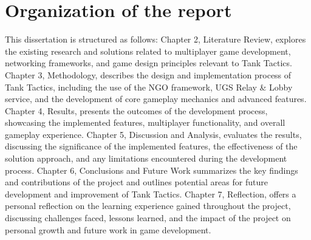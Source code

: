 \section{Organization of the report} %
\label{sec:intro_org} %
This dissertation is structured as follows: Chapter 2, Literature Review, explores the existing research and solutions related to multiplayer game development, networking frameworks, and game design principles relevant to Tank Tactics. Chapter 3, Methodology, describes the design and implementation process of Tank Tactics, including the use of the NGO framework, UGS Relay \& Lobby service, and the development of core gameplay mechanics and advanced features. Chapter 4, Results, presents the outcomes of the development process, showcasing the implemented features, multiplayer functionality, and overall gameplay experience. Chapter 5, Discussion and Analysis, evaluates the results, discussing the significance of the implemented features, the effectiveness of the solution approach, and any limitations encountered during the development process. Chapter 6, Conclusions and Future Work summarizes the key findings and contributions of the project and outlines potential areas for future development and improvement of Tank Tactics. Chapter 7, Reflection, offers a personal reflection on the learning experience gained throughout the project, discussing challenges faced, lessons learned, and the impact of the project on personal growth and future work in game development.


